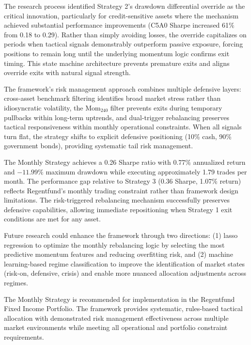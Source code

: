 \documentclass[11pt, letterpaper]{article}
\begin{document}
The research process identified Strategy 2's drawdown differential override as the critical innovation, particularly for credit-sensitive assets where the mechanism achieved substantial performance improvements (C5A0 Sharpe increased 61\% from 0.18 to 0.29). Rather than simply avoiding losses, the override capitalizes on periods when tactical signals demonstrably outperform passive exposure, forcing positions to remain long until the underlying momentum logic confirms exit timing. This state machine architecture prevents premature exits and aligns override exits with natural signal strength.

The framework's risk management approach combines multiple defensive layers: cross-asset benchmark filtering identifies broad market stress rather than idiosyncratic volatility, the Mom$_{240}$ filter prevents exits during temporary pullbacks within long-term uptrends, and dual-trigger rebalancing preserves tactical responsiveness within monthly operational constraints. When all signals turn flat, the strategy shifts to explicit defensive positioning (10\% cash, 90\% government bonds), providing systematic tail risk management.

The Monthly Strategy achieves a 0.26 Sharpe ratio with 0.77\% annualized return and $-11.99\%$ maximum drawdown while executing approximately 1.79 trades per month. The performance gap relative to Strategy 3 (0.36 Sharpe, 1.07\% return) reflects Regentfund's monthly trading constraint rather than framework design limitations. The risk-triggered rebalancing mechanism successfully preserves defensive capabilities, allowing immediate repositioning when Strategy 1 exit conditions are met for any asset.

Future research could enhance the framework through two directions: (1) lasso regression to optimize the monthly rebalancing logic by selecting the most predictive momentum features and reducing overfitting risk, and (2) machine learning-based regime classification to improve the identification of market states (risk-on, defensive, crisis) and enable more nuanced allocation adjustments across regimes.

The Monthly Strategy is recommended for implementation in the Regentfund Fixed Income Portfolio. The framework provides systematic, rules-based tactical allocation with demonstrated risk management effectiveness across multiple market environments while meeting all operational and portfolio constraint requirements.

\end{document}
